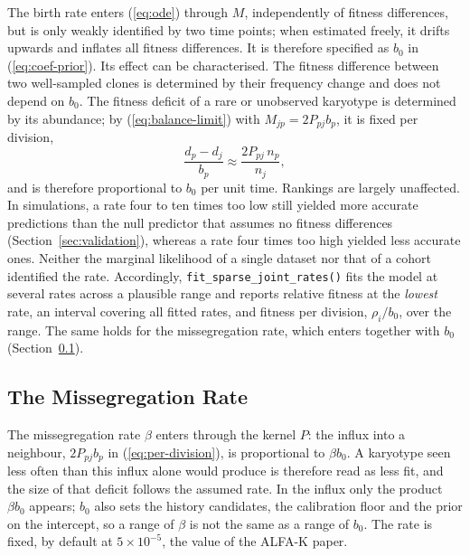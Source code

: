 \documentclass[11pt]{article}
\begin{document}
The birth rate enters (\ref{eq:ode}) through $M$, independently of fitness
differences, but is only weakly identified by two time points; when estimated
freely, it drifts upwards and inflates all fitness differences. It is
therefore specified as $b_0$ in (\ref{eq:coef-prior}). Its effect can be
characterised. The fitness difference between two well-sampled clones is
determined by their frequency change and does not depend on $b_0$. The
fitness deficit of a rare or unobserved karyotype is determined by its
abundance; by (\ref{eq:balance-limit}) with $M_{jp}=2P_{pj}b_p$, it is fixed
per division,
\begin{equation}
  \frac{d_p-d_j}{b_p}\approx\frac{2P_{pj}\,n_p}{n_j},
  \label{eq:per-division}
\end{equation}
and is therefore proportional to $b_0$ per unit time. Rankings are largely
unaffected. In simulations, a rate four to ten times too low still yielded
more accurate predictions than the null predictor that assumes no fitness
differences (Section~\ref{sec:validation}), whereas a rate four times too high
yielded less accurate ones. Neither the marginal
likelihood of a single dataset nor that of a cohort identified the rate.
Accordingly, \texttt{fit\_sparse\_joint\_rates()} fits the model at several
rates across a plausible range and reports relative fitness at the
\emph{lowest} rate, an interval covering all fitted rates, and fitness per
division, $\rho_i/b_0$, over the range. The same holds for the
missegregation rate, which enters together with $b_0$
(Section~\ref{sec:sj-beta}).

\subsection{The Missegregation Rate}
\label{sec:sj-beta}

The missegregation rate $\beta$ enters through the kernel $P$: the influx
into a neighbour, $2P_{pj}b_p$ in (\ref{eq:per-division}), is proportional to
$\beta b_0$. A karyotype seen less often than this influx alone would produce
is therefore read as less fit, and the size of that deficit follows the
assumed rate. In the influx only the product $\beta b_0$ appears; $b_0$ also
sets the history candidates, the calibration floor and the prior on the
intercept, so a range of $\beta$ is not the same as a range of $b_0$. The
rate is fixed, by default at $5\times10^{-5}$, the value of the ALFA-K paper.
\end{document}

